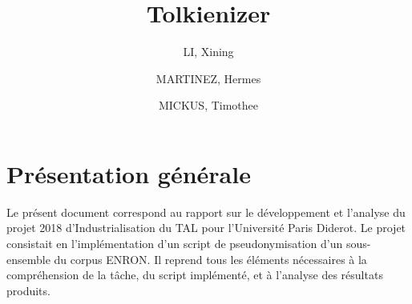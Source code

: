 \documentclass{article}
\title{Tolkienizer}
\author{LI, Xining \and MARTINEZ, Hermes \and MICKUS, Timothee}
\begin{document}
\maketitle

\clearpage

\section{Présentation générale}
\par
Le présent document correspond au rapport sur le développement et l'analyse du projet 2018 d'Industrialisation du TAL pour l'Université Paris Diderot.
Le projet consistait en l'implémentation d'un script de pseudonymisation d'un sous-ensemble du corpus ENRON.
Il reprend tous les éléments nécessaires à la compréhension de la tâche, du script implémenté, et à l'analyse des résultats produits.
\end{document}
